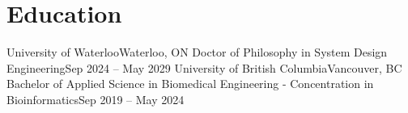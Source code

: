 \section{Education}
  \resumeSubHeadingListStart
    \resumeSubheading
      {University of Waterloo}{Waterloo, ON}
      {Doctor of Philosophy in System Design Engineering}{Sep 2024 -- May 2029}
    \resumeItemListStart
    \resumeItemListEnd
    \resumeSubheading
      {University of British Columbia}{Vancouver, BC}
      {Bachelor of Applied Science in Biomedical Engineering - Concentration in Bioinformatics}{Sep 2019 -- May 2024}
    \resumeItemListStart
    \resumeItemListEnd
  \resumeSubHeadingListEnd
